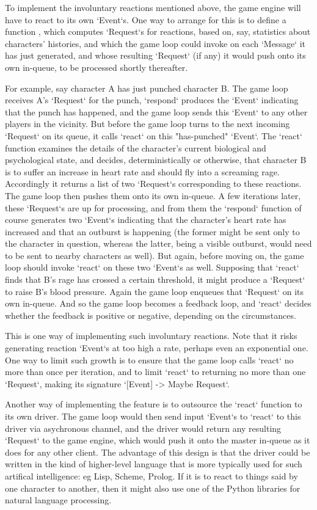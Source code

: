 To implement the involuntary reactions mentioned above, the game engine will
have to react to its own `Event`s.
One way to arrange for this is to define a
function , which computes `Request`s for
reactions, based on, say, statistics about characters' histories, and which
the game loop could invoke on each `Message` it has just generated, and whose
resulting `Request` (if any) it would push onto its own in-queue, to be
processed shortly thereafter.

For example, say character A has just punched character B\@.
The game loop receives A's `Request` for the punch, `respond` produces
the `Event` indicating that the punch has happened, and the
game loop sends this `Event` to any other players
in the vicinity.
But before the game loop turns to the next incoming `Request`
on its queue, it calls `react` on this "has-punched" `Event`.
The `react`
function examines the details of the character's current biological and
psychological state, and decides, deterministically or otherwise, that
character B is to suffer an increase in heart rate and should fly into a
screaming rage.
Accordingly it returns a list of two `Request`s corresponding to these
reactions.
The game loop then pushes them onto its own in-queue.
A few iterations later, these `Request`s are up for processing, and from them
the `respond` function of course generates two `Event`s indicating that the
character's heart rate has increased and that an outburst is happening (the
former might be sent only to the character in question, whereas the latter,
being a visible outburst, would need to be sent to nearby characters as well).
But again, before moving on, the game loop should invoke `react` on these two
`Event`s as well.
Supposing that `react` finds that B's rage has
crossed a certain threshold, it might produce a `Request` to raise B's blood
pressure.
Again the game loop enqueues that `Request` on its
own in-queue.
And so the game loop becomes a feedback loop, and `react` decides
whether the feedback is positive or negative, depending on the circumstances.

This is one way of implementing such involuntary reactions.
Note that it risks generating reaction `Event`s at too high a rate, perhaps
even an exponential one.
One way to limit such growth is to ensure that the game loop calls `react`
no more than once per iteration, and to limit `react` to returning no more than
one `Request`, making its signature `[Event] -> Maybe Request`.

Another way of implementing the feature is to outsource the `react` function
to its own driver.
The game loop would then send input `Event`s to
`react` to this driver via asychronous channel, and the driver would return any
resulting `Request` to the game engine, which would push it onto the master
in-queue as it does for any other client.
The advantage of this design is that
the driver could be written in the kind of higher-level language that
is more typically used for such artifical intelligence: eg Lisp, Scheme,
Prolog.
If it is to react to things said by one character to another, then it
might also use one of the Python libraries for natural language processing.

